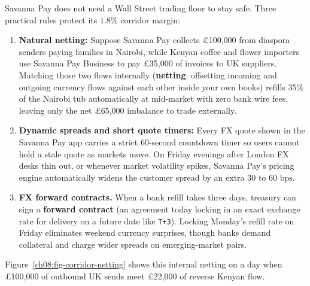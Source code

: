 Savanna Pay does not need a Wall Street trading floor to stay safe. Three practical rules protect its $1.8\%$ corridor margin:
\begin{enumerate}
  \item \textbf{Natural netting:} Suppose Savanna Pay collects \pounds 100,000 from diaspora senders paying families in Nairobi, while Kenyan coffee and flower importers use Savanna Pay Business to pay \pounds 35,000 of invoices to UK suppliers. Matching those two flows internally (\textbf{netting}: offsetting incoming and outgoing currency flows against each other inside your own books) refills $35\%$ of the Nairobi tub automatically at mid-market with zero bank wire fees, leaving only the net \pounds 65,000 imbalance to trade externally.
  \item \textbf{Dynamic spreads and short quote timers:} Every FX quote shown in the Savanna Pay app carries a strict $60\text{-second}$ countdown timer so users cannot hold a stale quote as markets move. On Friday evenings after London FX desks thin out, or whenever market volatility spikes, Savanna Pay's pricing engine automatically widens the customer spread by an extra $30\text{ to }60\text{ bps}$.
  \item \textbf{FX forward contracts.} When a bank refill takes three days, treasury can sign a \textbf{forward contract} (an agreement today locking in an exact exchange rate for delivery on a future date like \texttt{T+3}). Locking Monday's refill rate on Friday eliminates weekend currency surprises, though banks demand collateral and charge wider spreads on emerging-market pairs.
\end{enumerate}

Figure~\ref{ch08:fig-corridor-netting} shows this internal netting on a day when \pounds 100,000 of outbound UK sends meet \pounds 22,000 of reverse Kenyan flow.

